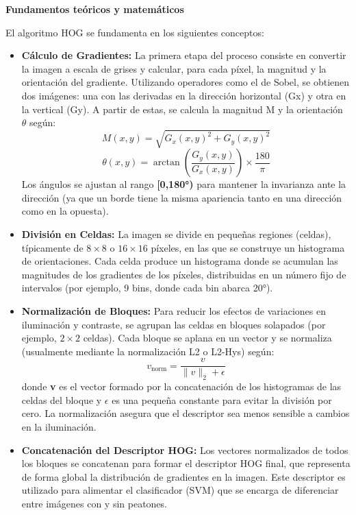 \documentclass[a4paper]{article}
\begin{document}
  \par\vspace{0.5cm}
  \textbf{Fundamentos teóricos y matemáticos}
  \par\vspace{0.5cm}

  El algoritmo HOG se fundamenta en los siguientes conceptos:

  \begin{itemize}
    \item \textbf{Cálculo de Gradientes:} 
    La primera etapa del proceso consiste en convertir la imagen a escala de grises y calcular, para cada píxel, la magnitud y la orientación del gradiente. Utilizando operadores como el de Sobel, se obtienen dos imágenes: una con las derivadas en la dirección horizontal (Gx) y otra en la vertical (Gy). A partir de estas, se calcula la magnitud M y la orientación \(\theta\) según:
    \[
    M(x,y) = \sqrt{G_x(x,y)^2 + G_y(x,y)^2}
    \]
    \[
    \theta(x,y) = \arctan\left(\frac{G_y(x,y)}{G_x(x,y)}\right) \times \frac{180}{\pi}
    \]
    Los ángulos se ajustan al rango \textbf{[0,180°)} para mantener la invarianza ante la dirección (ya que un borde tiene la misma apariencia tanto en una dirección como en la opuesta).
    \item \textbf{División en Celdas:}
    La imagen se divide en pequeñas regiones (celdas), típicamente de \(8\times8\) o \(16\times16\) píxeles, en las que se construye un histograma de orientaciones. Cada celda produce un histograma donde se acumulan las magnitudes de los gradientes de los píxeles, distribuidas en un número fijo de intervalos (por ejemplo, 9 bins, donde cada bin abarca 20°).
    \item \textbf{Normalización de Bloques:}
    Para reducir los efectos de variaciones en iluminación y contraste, se agrupan las celdas en bloques solapados (por ejemplo, \(2\times2\) celdas). Cada bloque se aplana en un vector y se normaliza (usualmente mediante la normalización L2 o L2-Hys) según:
    \[
    v_{\text{norm}} = \frac{v}{\|v\|_2 + \epsilon}
    \]
    donde \textbf{v} es el vector formado por la concatenación de los histogramas de las celdas del bloque y \textbf{\(\epsilon\)} es una pequeña constante para evitar la división por cero. La normalización asegura que el descriptor sea menos sensible a cambios en la iluminación.
    \item \textbf{Concatenación del Descriptor HOG:}
    Los vectores normalizados de todos los bloques se concatenan para formar el descriptor HOG final, que representa de forma global la distribución de gradientes en la imagen. Este descriptor es utilizado para alimentar el clasificador (SVM) que se encarga de diferenciar entre imágenes con y sin peatones.
\end{itemize}
\end{document}
